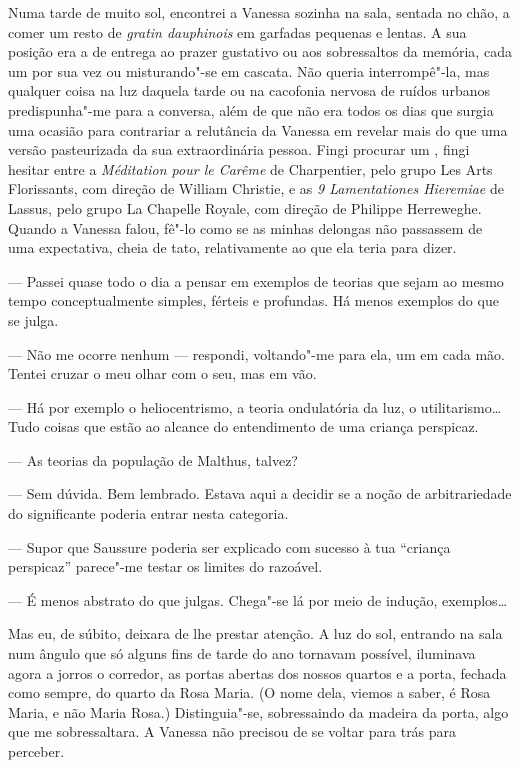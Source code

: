 Numa tarde de muito sol, encontrei a Vanessa sozinha na sala, sentada no
chão, a comer um resto de \emph{gratin dauphinois }em garfadas pequenas
e lentas. A sua posição era a de entrega ao prazer gustativo ou aos
sobressaltos da memória, cada um por sua vez ou misturando"-se em
cascata. Não queria interrompê"-la, mas qualquer coisa na luz daquela tarde ou na cacofonia nervosa de
ruídos urbanos predispunha"-me para a conversa, além de que não era todos
os dias que surgia uma ocasião para contrariar a relutância da Vanessa
em revelar mais do que uma versão pasteurizada da sua extraordinária
pessoa. Fingi procurar um , fingi hesitar entre a \emph{Méditation
pour le Carême }de Charpentier, pelo grupo Les Arts Florissants, com
direção de William Christie, e as \emph{9 Lamentationes Hieremiae }de
Lassus, pelo grupo La Chapelle Royale, com direção de Philippe
Herreweghe. Quando a Vanessa falou, fê"-lo como se
as minhas delongas não passassem de uma expectativa, cheia de tato,
relativamente ao que ela teria para dizer.

--- Passei quase todo o dia a pensar em exemplos de teorias que sejam ao
  mesmo tempo conceptualmente simples, férteis e profundas. Há menos
  exemplos do que se julga.

--- Não me ocorre nenhum --- respondi, voltando"-me para ela, um  em cada
  mão. Tentei cruzar o meu olhar com o seu, mas em vão.

--- Há por exemplo o heliocentrismo, a teoria ondulatória da luz, o
  utilitarismo\ldots{} Tudo coisas que estão ao alcance do entendimento de
  uma criança perspicaz.

--- As teorias da população de Malthus, talvez?

--- Sem dúvida. Bem lembrado. Estava aqui a decidir se a noção de
  arbitrariedade do significante poderia entrar nesta categoria.

--- Supor que Saussure poderia ser explicado com sucesso à tua ``criança
  perspicaz'' parece"-me testar os limites do razoável.

--- É menos abstrato do que julgas. Chega"-se lá por meio de indução,
  exemplos\ldots{}


Mas eu, de súbito, deixara de lhe prestar atenção. A luz do sol,
entrando na sala num ângulo que só alguns fins de tarde do ano tornavam
possível, iluminava agora a jorros o corredor, as portas abertas dos
nossos quartos e a porta, fechada como sempre, do quarto da Rosa Maria.
(O nome dela, viemos a saber, é Rosa Maria, e não Maria Rosa.)
Distinguia"-se, sobressaindo da madeira da porta, algo que me
sobressaltara. A Vanessa não precisou de se voltar para trás para
perceber.

